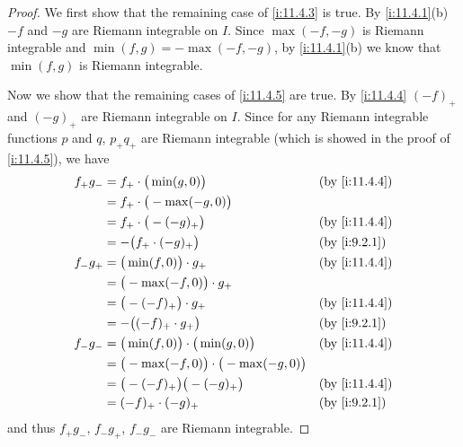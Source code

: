 \begin{proof}
  We first show that the remaining case of \cref{i:11.4.3} is true.
  By \cref{i:11.4.1}(b) \(-f\) and \(-g\) are Riemann integrable on \(I\).
  Since \(\max(-f, -g)\) is Riemann integrable and \(\min(f, g) = -\max(-f, -g)\), by \cref{i:11.4.1}(b) we know that \(\min(f, g)\) is Riemann integrable.

  Now we show that the remaining cases of \cref{i:11.4.5} are true.
  By \cref{i:11.4.4} \((-f)_+\) and \((-g)_+\) are Riemann integrable on \(I\).
  Since for any Riemann integrable functions \(p\) and \(q\), \(p_+ q_+\) are Riemann integrable (which is showed in the proof of \cref{i:11.4.5}), we have
  \begin{align*}
    f_+ g_- & = f_+ \cdot \big(\min(g, 0)\big)                      &  & \by{i:11.4.4} \\
            & = f_+ \cdot \big(-\max(-g, 0)\big)                                       \\
            & = f_+ \cdot \big(-(-g)_+\big)                         &  & \by{i:11.4.4} \\
            & = -\big(f_+ \cdot (-g)_+\big)                         &  & \by{i:9.2.1}  \\
    f_- g_+ & = \big(\min(f, 0)\big) \cdot g_+                      &  & \by{i:11.4.4} \\
            & = \big(-\max(-f, 0)\big) \cdot g_+                                       \\
            & = \big(-(-f)_+\big) \cdot g_+                         &  & \by{i:11.4.4} \\
            & = -\big((-f)_+ \cdot g_+\big)                         &  & \by{i:9.2.1}  \\
    f_- g_- & = \big(\min(f, 0)\big) \cdot \big(\min(g, 0)\big)     &  & \by{i:11.4.4} \\
            & = \big(-\max(-f, 0)\big) \cdot \big(-\max(-g, 0)\big)                    \\
            & = \big(-(-f)_+\big) \big(-(-g)_+\big)                 &  & \by{i:11.4.4} \\
            & = (-f)_+ \cdot (-g)_+                                 &  & \by{i:9.2.1}
  \end{align*}
  and thus \(f_+ g_-\), \(f_- g_+\), \(f_- g_-\) are Riemann integrable.
\end{proof}
